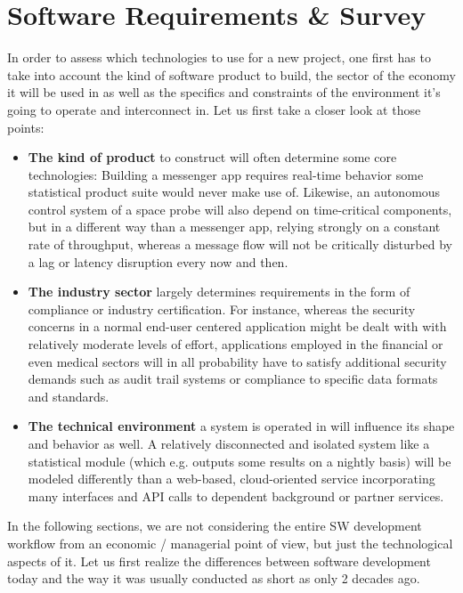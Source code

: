 \chapter{Software Requirements \& Survey}
\label{ch:software_requirements}

In order to assess which technologies to use for a new project, one first has to take into account the kind of software product to build, the sector of the economy it will be used in as well as the specifics and constraints of the environment it's going to operate and interconnect in. Let us first take a closer look at those points:

\begin{itemize}
	\item \textbf{The kind of product} to construct will often determine some core technologies: Building a messenger app requires real-time behavior some statistical product suite would never make use of. Likewise, an autonomous control system of a space probe will also depend on time-critical components, but in a different way than a messenger app, relying strongly on a constant rate of throughput, whereas a message flow will not be critically disturbed by a lag or latency disruption every now and then.
	\item \textbf{The industry sector} largely determines requirements in the form of compliance or industry certification. For instance, whereas the security concerns in a normal end-user centered application might be dealt with with relatively moderate levels of effort, applications employed in the financial or even medical sectors will in all probability have to satisfy additional security demands such as audit trail systems or compliance to specific data formats and standards.
	\item \textbf{The technical environment} a system is operated in will influence its shape and behavior as well. A relatively disconnected and isolated system like a statistical module (which e.g. outputs some results on a nightly basis) will be modeled differently than a web-based, cloud-oriented service incorporating many interfaces and API calls to dependent background or partner services.
\end{itemize}

In the following sections, we are not considering the entire SW development workflow from an economic / managerial point of view, but just the technological aspects of it. Let us first realize the differences between software development today and the way it was usually conducted as short as only 2 decades ago.

